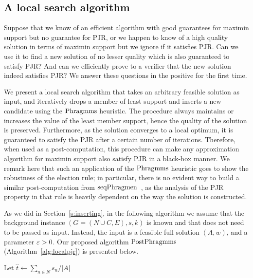 \subsection{A local search algorithm}\label{s:LS}

Suppose that we know of an efficient algorithm with good guarantees for maximin support but no guarantee for PJR, or we happen to know of a high quality solution in terms of maximin support but we ignore if it satisfies PJR. Can we use it to find a new solution of no lesser quality which is also guaranteed to satisfy PJR? And can we efficiently prove to a verifier that the new solution indeed satisfies PJR? We answer these questions in the positive for the first time.

We present a local search algorithm that takes an arbitrary feasible solution as input, and iteratively drops a member of least support and inserts a new candidate using the $\operatorname{Phragmms}$ heuristic. The procedure always maintains or increases the value of the least member support, hence the quality of the solution is preserved. Furthermore, as the solution converges to a local optimum, it is guaranteed to satisfy the PJR after a certain number of iterations. 
Therefore, when used as a post-computation, this procedure can make any approximation algorithm for maximin support also satisfy PJR in a black-box manner. 
We remark here that such an application of the $\operatorname{Phragmms}$ heuristic goes to show the robustness of the election rule; in particular, there is no evident way to build a similar post-computation from $\operatorname{seqPhragmen}$~\cite{brill2017phragmen}, as the analysis of the PJR property in that rule is heavily dependent on the way the solution is constructed. 

As we did in Section~\ref{s:inserting}, in the following algorithm we assume that the background instance $(G=(N\cup C, E), s, k)$ is known and that does not need to be passed as input. 
Instead, the input is a feasible full solution $(A,w)$, and a parameter $\varepsilon>0$. 
Our proposed algorithm $\operatorname{PostPhragmms}$ (Algorithm~\ref{alg:localpjr}) is presented below. 

\begin{algorithm}[htb]\label{alg:localpjr}
\SetAlgoLined
{}

Let $\hat{t}\leftarrow \sum_{n\in N} s_n / |A|$\;
\caption{$\LSPJR(A,w,\eps)$}
\end{algorithm}

